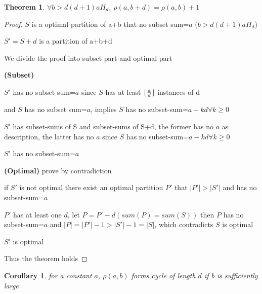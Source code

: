 \documentclass[12pt,a4paper]{article}
\DeclarePairedDelimiter\floor{\lfloor}{\rfloor}
\newtheorem{theorem}{Theorem}[section]
\newtheorem{corollary}{Corollary}[theorem]
\begin{document}
\begin{theorem}
	$\forall b>d(d+1)aH_d$, $\rho(a,b+d)=\rho(a,b)+1$
\end{theorem}

\begin{proof}

    $S$ is a optimal partition of a+b that no subset sum=$a$ ($b>d(d+1)aH_d$)
    
    $S'=S+d$ is a partition of a+b+d 

    We divide the proof into subset part and optimal part

    {\bf(Subset)}

    $S'$ has no subset sum=$a$ since $S$ has at least $\floor{\frac{a}{d}}$ instances of d

    and $S$ has no subset sum=$a$, implies $S$ has no subset-sum=$a-kd \forall k\geq0$

    $S'$ has subset-sums of S and subset-sums of S+d, the former has no $a$ as description, the latter has no $a$ since $S$ has no subset-sum=$a-kd\forall k\geq0$

    $S'$ has no subset-sum=$a$

    {\bf(Optimal)}
        prove by contradiction

        if $S'$ is not optimal there exist an optimal partition $P'$ that $|P'|>|S'|$ and has no subset-sum=$a$

        $P'$ has at least one $d$, let $P=P'-d(sum(P)=sum(S))$ then $P$ has no subset-sum=$a$ and $|P|=|P'|-1>|S'|-1=|S|$, which contradicts $S$ is optimal

        $S'$ is optimal

    Thus the theorem holds
\end{proof}

\begin{corollary}
for a constant $a$, $\rho(a,b)$ forms cycle of length $d$ if b is sufficiently large
\end{corollary}
\end{document}
